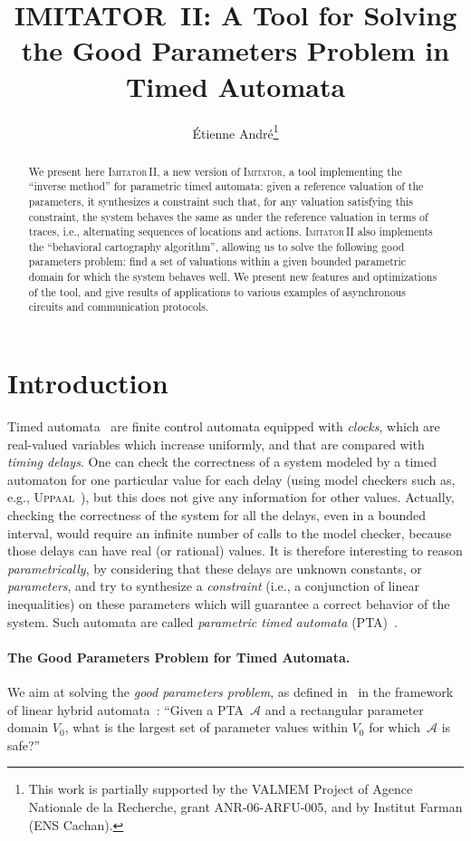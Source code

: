\documentclass[submission,copyright,creativecommons]{eptcs}
\title{IMITATOR~II: A Tool for Solving \\ the Good Parameters Problem in Timed Automata}
\author{\'Etienne Andr\'e\thanks{This work is partially supported by the VALMEM Project of Agence Nationale de la Recherche, grant ANR-06-ARFU-005, and by Institut Farman (ENS Cachan).}
\institute{LSV, ENS de Cachan \& CNRS, Cachan, France}
\email{andre@lsv.ens-cachan.fr}
}
\newcommand{\A}{\mathcal{A}}
\newcommand{\imitator}{\textsc{Imitator}}
\newcommand{\imitatordeux}{\textsc{Imitator}\,II}
\newcommand{\uppaal}{\textsc{Uppaal}}
\newcommand{\paragraphe}[1]{\paragraph{#1.}}
\begin{document}
\maketitle


\begin{abstract}
We present here \imitatordeux{}, a new version of \imitator{}, a tool implementing the ``inverse method'' for parametric timed automata:
given a reference valuation of the parameters, it synthesizes a constraint such that, for any valuation satisfying this constraint, the system behaves the same as under the reference valuation in terms of traces, i.e., alternating sequences of locations and actions.
\imitatordeux{} also implements the ``behavioral cartography algorithm'', allowing us to solve the following good parameters problem: find a set of valuations within a given bounded parametric domain for which the system behaves well.
We present new features and optimizations of the tool, and give results of applications to various examples of asynchronous circuits and communication protocols.
\end{abstract}




\section{Introduction}


Timed automata~\cite{ad94} are finite control automata equipped with {\em clocks}, which are real-valued variables which increase uniformly, and that are compared with \emph{timing delays}.
One can check the correctness of a system modeled by a timed automaton for one particular value for each delay (using model checkers such as, e.g., \uppaal{}~\cite{lpy97}), but this does not give any information for other values.
Actually, checking the correctness of the system for all the delays, even in a bounded interval, would require an infinite number of calls to the model checker, because those delays can have real (or rational) values.
It is therefore interesting to reason \emph{parametrically}, by considering that these delays are unknown constants, or \emph{parameters}, and try to synthesize a {\em constraint} (i.e., a conjunction of linear inequalities) on these parameters which will guarantee a correct behavior of the system.
Such automata are called \emph{parametric timed automata} (PTA)~\cite{ahv93}. 

\paragraphe{The Good Parameters Problem for Timed Automata}
We aim at solving the \emph{good parameters problem}, as defined in~\cite{fjk08} in the framework of linear hybrid automata~\cite{achh92}:
``Given a PTA~$\A$ and a rectangular parameter domain $V_0$, what is the largest set of parameter values within $V_0$ for which~$\A$ is safe?''
\end{document}
